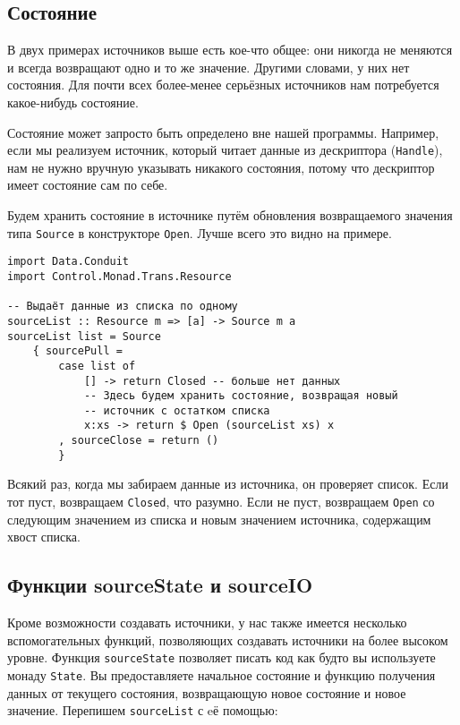 \subsection{Состояние}
В двух примерах источников выше есть кое-что общее: они никогда не меняются и всегда возвращают одно и то же
значение. Другими словами, у них нет состояния. Для почти всех более-менее серьёзных источников нам
потребуется какое-нибудь состояние.

\begin{remark}
Состояние может запросто быть определено вне нашей программы. Например, если мы
реализуем источник, который читает данные из дескриптора (\lstinline{Handle}), нам не нужно вручную
указывать никакого состояния, потому что дескриптор имеет состояние сам по себе.
\end{remark}

Будем хранить состояние в источнике путём обновления возвращаемого значения типа
\lstinline=Source= в конструкторе \lstinline=Open=. Лучше всего это видно на
примере.

\begin{lstlisting}
import Data.Conduit
import Control.Monad.Trans.Resource

-- Выдаёт данные из списка по одному
sourceList :: Resource m => [a] -> Source m a
sourceList list = Source
    { sourcePull =
        case list of
            [] -> return Closed -- больше нет данных
            -- Здесь будем хранить состояние, возвращая новый
            -- источник с остатком списка
            x:xs -> return $ Open (sourceList xs) x
        , sourceClose = return ()
        }
\end{lstlisting}

Всякий раз, когда мы забираем данные из источника, он проверяет список. Если тот пуст,
возвращаем \lstinline=Closed=, что разумно. Если не пуст, возвращаем \lstinline=Open= со
следующим значением из
списка и новым значением источника, содержащим хвост списка.

\subsection{Функции sourceState и sourceIO}
Кроме возможности создавать источники, у нас также имеется несколько вспомогательных функций,
позволяющих создавать источники на более высоком уровне. Функция \lstinline=sourceState=
позволяет писать
код как будто вы используете монаду \lstinline=State=. Вы предоставляете начальное
состояние и
функцию получения данных от текущего состояния, возвращающую новое состояние и
новое значение. Перепишем \lstinline=sourceList= с eё помощью:

